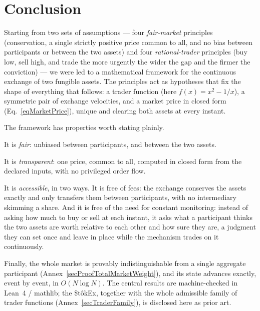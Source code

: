 \documentclass[letterpaper]{article}
\newcommand{\StokEx}{\$t\^{o}kEx}
\begin{document}
\clearpage

\section{Conclusion}

Starting from two sets of assumptions --- four \emph{fair-market} principles (conservation, a single strictly positive price common to all, and no bias between participants or between the two assets) and four \emph{rational-trader} principles (buy low, sell high, and trade the more urgently the wider the gap and the firmer the conviction) --- we were led to a mathematical framework for the continuous exchange of two fungible assets. The principles act as hypotheses that fix the shape of everything that follows: a trader function (here $f(x) = x^2 - 1/x$), a symmetric pair of exchange velocities, and a market price in closed form (Eq.~\eqref{eqMarketPrice}), unique and clearing both assets at every instant.

The framework has properties worth stating plainly.

It is \emph{fair}: unbiased between participants, and between the two assets.

It is \emph{transparent}: one price, common to all, computed in closed form from the declared inputs, with no privileged order flow.

It is \emph{accessible}, in two ways. It is free of fees: the exchange conserves the assets exactly and only transfers them between participants, with no intermediary skimming a share. And it is free of the need for constant monitoring: instead of asking how much to buy or sell at each instant, it asks what a participant thinks the two assets are worth relative to each other and how sure they are, a judgment they can set once and leave in place while the mechanism trades on it continuously.

Finally, the whole market is provably indistinguishable from a single aggregate participant (Annex~\ref{secProofTotalMarketWeight}), and its state advances exactly, event by event, in $O(N \log N)$. The central results are machine-checked in Lean~4 / mathlib; the \StokEx{}, together with the whole admissible family of trader functions (Annex~\ref{secTraderFamily}), is disclosed here as prior art.

\clearpage

\end{document}
